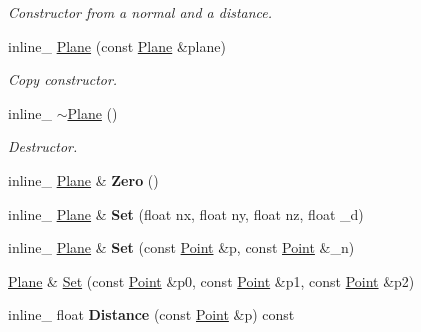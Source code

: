 \begin{DoxyCompactItemize}
\begin{DoxyCompactList}\small\item\em Constructor from a normal and a distance. \end{DoxyCompactList}\item 
inline\+\_\+ \hyperlink{classOpcode_1_1Plane_a72a9f3f24bd1a5dc21e9e9125e90f3cb}{Plane} (const \hyperlink{classOpcode_1_1Plane}{Plane} \&plane)\hypertarget{classOpcode_1_1Plane_a72a9f3f24bd1a5dc21e9e9125e90f3cb}{}\label{classOpcode_1_1Plane_a72a9f3f24bd1a5dc21e9e9125e90f3cb}

\begin{DoxyCompactList}\small\item\em Copy constructor. \end{DoxyCompactList}\item 
inline\+\_\+ \hyperlink{classOpcode_1_1Plane_ad19a8aed7de11a1f78f5527827f4c111}{$\sim$\+Plane} ()\hypertarget{classOpcode_1_1Plane_ad19a8aed7de11a1f78f5527827f4c111}{}\label{classOpcode_1_1Plane_ad19a8aed7de11a1f78f5527827f4c111}

\begin{DoxyCompactList}\small\item\em Destructor. \end{DoxyCompactList}\item 
inline\+\_\+ \hyperlink{classOpcode_1_1Plane}{Plane} \& {\bfseries Zero} ()\hypertarget{classOpcode_1_1Plane_afdd4375bba1b742200921fc0b77c3498}{}\label{classOpcode_1_1Plane_afdd4375bba1b742200921fc0b77c3498}

\item 
inline\+\_\+ \hyperlink{classOpcode_1_1Plane}{Plane} \& {\bfseries Set} (float nx, float ny, float nz, float \+\_\+d)\hypertarget{classOpcode_1_1Plane_a95532683b34f4f0d45c6e9aae3d00a57}{}\label{classOpcode_1_1Plane_a95532683b34f4f0d45c6e9aae3d00a57}

\item 
inline\+\_\+ \hyperlink{classOpcode_1_1Plane}{Plane} \& {\bfseries Set} (const \hyperlink{classOpcode_1_1Point}{Point} \&p, const \hyperlink{classOpcode_1_1Point}{Point} \&\+\_\+n)\hypertarget{classOpcode_1_1Plane_a9b6881323db655a7353dfcb97ae813eb}{}\label{classOpcode_1_1Plane_a9b6881323db655a7353dfcb97ae813eb}

\item 
\hyperlink{classOpcode_1_1Plane}{Plane} \& \hyperlink{classOpcode_1_1Plane_a5a2f7f130ff82cbb0ef491951aed6ff4}{Set} (const \hyperlink{classOpcode_1_1Point}{Point} \&p0, const \hyperlink{classOpcode_1_1Point}{Point} \&p1, const \hyperlink{classOpcode_1_1Point}{Point} \&p2)
\item 
inline\+\_\+ float {\bfseries Distance} (const \hyperlink{classOpcode_1_1Point}{Point} \&p) const \hypertarget{classOpcode_1_1Plane_a18ab4243874505c3c99c19579f944d82}{}\label{classOpcode_1_1Plane_a18ab4243874505c3c99c19579f944d82}


\end{DoxyCompactItemize}
